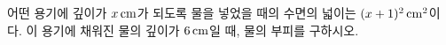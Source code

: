 \hspace*{2mm}\begin{minipage}[t]{\dimexpr\linewidth-2mm\relax}\vspace{0pt}
어떤 용기에 깊이가 $x\mkern3mu \mathrm{cm}$가 되도록 물을 넣었을 때의 수면의 넓이는 $(x+1)^2\mkern3mu \mathrm{cm}^2$이다. 이 용기에 채워진 물의 깊이가 $6\mkern3mu \mathrm{cm}$일 때, 물의 부피를 구하시오.\end{minipage}
